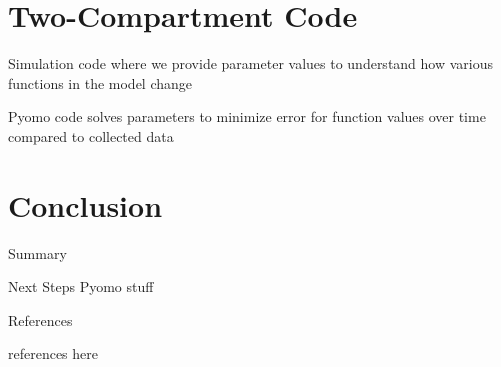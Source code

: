 \documentclass[10pt]{beamer}
\begin{document}
\section{Two-Compartment Code}

\begin{frame}[Simulation]
    Simulation code where we provide parameter values to understand how various functions in the model change
\end{frame}

\begin{frame}[Pyomo]
    Pyomo code solves parameters to minimize error for function values over time compared to collected data
\end{frame}

\section{Conclusion}

\begin{frame}{Summary}
    
\end{frame}

\begin{frame}{Next Steps}
    Pyomo stuff
\end{frame}
    


\appendix

\begin{frame}{References}

    references here
    
\end{frame}
\end{document}
